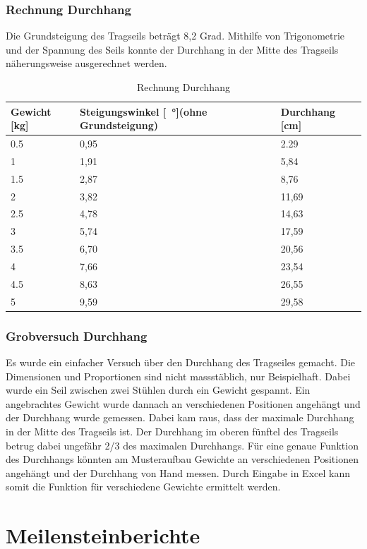 \documentclass[a4paper]{report}
\begin{document}
\subsection{Rechnung Durchhang}
\label{ssec:RechDurch}
Die Grundsteigung des Tragseils beträgt 8,2 Grad. Mithilfe von Trigonometrie und der Spannung des Seils konnte der Durchhang in der Mitte des Tragseils näherungsweise ausgerechnet werden.

\vspace{1em}
\noindent
\begin{table}[h!]
	\begin{tabular}{|p{}|p{}|p{}|}
		\hline
		\textbf{Gewicht [kg]} & \textbf{Steigungswinkel [\SI{}{\degree}](ohne Grundsteigung)} &\textbf{Durchhang [cm]}\\
		\hline
		0.5&0,95&2.29\\
		\hline
		1&1,91&5,84\\
		\hline
		1.5&2,87&8,76\\
		\hline
		2&3,82&11,69\\
		\hline
		2.5&4,78&14,63\\
		\hline
		3&5,74&17,59\\
		\hline
		3.5&6,70&20,56\\
		\hline
		4&7,66&23,54\\
		\hline
		4.5&8,63&26,55\\
		\hline
		5&9,59&29,58\\
		\hline
	\end{tabular}
	\caption{Rechnung Durchhang}
	\label{tbl:DurchhangRechnung}
\end{table}


\subsection{Grobversuch Durchhang}
\label{app:ssec:GrobeversDurch}
Es wurde ein einfacher Versuch über den Durchhang des Tragseiles gemacht. Die Dimensionen und Proportionen sind nicht massstäblich, nur Beispielhaft. Dabei wurde ein Seil zwischen zwei Stühlen durch ein Gewicht gespannt. Ein angebrachtes Gewicht wurde dannach an verschiedenen Positionen angehängt und der Durchhang wurde gemessen. Dabei kam raus, dass der maximale Durchhang in der Mitte des Tragseils ist. Der Durchhang im oberen fünftel des Tragseils betrug dabei ungefähr 2/3 des maximalen Durchhangs.
Für eine genaue Funktion des Durchhangs könnten am Musteraufbau Gewichte an verschiedenen Positionen angehängt und der Durchhang von Hand messen. Durch Eingabe in Excel kann somit die Funktion für verschiedene Gewichte ermittelt werden.

\chapter{Meilensteinberichte}
\label{app:ch:MeilensteinBerichte}



\end{document}
